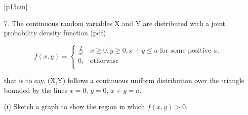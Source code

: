 \documentclass[a4paper,12pt]{article}
\begin{document}
 
 
  \begin{table}[ht!]
     \centering
     \begin{tabular}{|p{15cm}|}
     \hline

7. The continuous random variables X and Y are distributed with a joint probability density function (pdf) 
  


\[  f(x,y) = \begin{cases}  \frac{2}{a^2} & x \geq 0, y \geq 0, x + y \leq a \mbox{ for some positive } a,    \\
0,  & \mbox{otherwise} \\ 
  \end{cases}\]

 
 that is to say, (X,Y) follows a continuous uniform distribution over the triangle bounded by the lines $x = 0$,  $y = 0$,  $x+y = a$. 
 
 (i) Sketch a graph to show the region in which $f(x,y) > 0$.         

\\ \hline  
      \end{tabular}
    \end{table}
\end{document}
